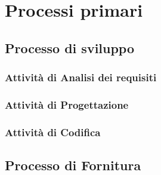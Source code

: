 
\chapter{Processi primari}
	\section{Processo di sviluppo}
		\subsection{Attività di Analisi dei requisiti}
			
			
			
			
			
		\subsection{Attività di Progettazione}
		\subsection{Attività di Codifica}
		
	\section{Processo di Fornitura}
